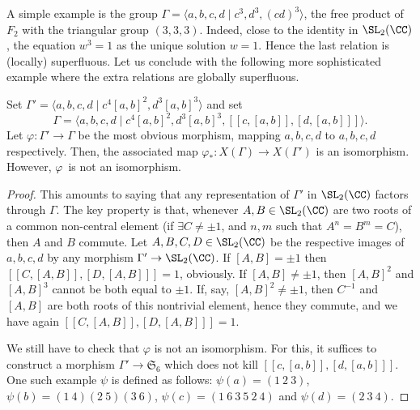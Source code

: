A simple example is the group
$\Gamma=\langle a,b,c,d\mid c^3,d^3,(cd)^3\rangle$, the free product of~$F_2$ with the triangular group $(3,3,3)$. Indeed, close to the identity
in $\SL_2(\CC)$, the equation $w^3=1$ as the unique solution $w=1$.
Hence the last relation is (locally) superfluous. Let us conclude with the
following more sophisticated example where the extra relations are globally
superfluous.

\begin{remark}
Set $\Gamma'=\langle a,b,c,d\mid c^4[a,b]^2, d^3[a,b]^3\rangle$ and set
\[ \Gamma=\langle a,b,c,d\mid c^4[a,b]^2, d^3[a,b]^3,
[[ c,[a,b]],[d,[a,b]]]\rangle. \]
Let $\varphi\colon\Gamma'\to\Gamma$ be the most obvious morphism,
mapping $a,b,c,d$ to $a,b,c,d$ respectively.
Then, the associated map $\varphi_*\colon X(\Gamma)\to X(\Gamma')$
is an isomorphism. However, $\varphi$~is not an isomorphism.
\end{remark}

\begin{proof}
This amounts to saying that any representation of $\Gamma'$ in $\SL_2(\CC)$
factors through $\Gamma$. The key property is that, whenever
$A,B\in\SL_2(\CC)$ are two roots of a common non-central element
(\ie if $\exists C\neq \pm1$, and $n,m$ such that $A^n=B^m=C$),
then $A$ and $B$ commute. Let $A,B,C,D\in\SL_2(\CC)$ be the respective
images of $a,b,c,d$ by any morphism $\Gamma'\to\SL_2(\CC)$. If $[A,B]=\pm1$
then $[[ C,[A,B]],[D,[A,B]]]=1$, obviously.
If $[A,B]\neq \pm1$, then $[A,B]^2$ and $[A,B]^3$ cannot be both equal
to $\pm 1$. If, say, $[A,B]^2\neq \pm 1$, then
$C^{-1}$ and $[A,B]$ are both roots of this nontrivial element, hence they
commute, and we have again $[[ C,[A,B]],[D,[A,B]]]=1$.

We still have to check that $\varphi$ is not an isomorphism. For this, it
suffices to construct a morphism $\Gamma'\to \mathfrak{S}_6$
which does not kill
$[[ c,[a,b]],[d,[a,b]]]$. One such example $\psi$ is defined as follows:
$\psi(a)=(1~2~3)$, $\psi(b)=(1~4)(2~5)(3~6)$, $\psi(c)=(1~6~3~5~2~4)$
and $\psi(d)=(2~3~4)$.
\end{proof}

\Changelback
